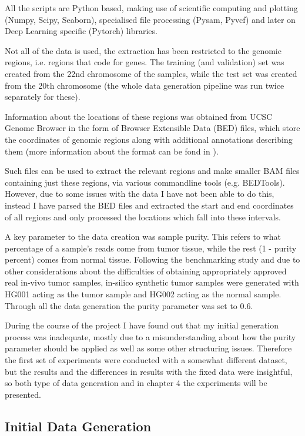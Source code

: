 \documentclass[bsc,frontabs,singlespacing,parskip,deptreport]{infthesis}
\begin{document}
All the scripts are Python based, making use of scientific computing and plotting (Numpy, Scipy, Seaborn), specialised file processing (Pysam, Pyvcf) and later on Deep Learning specific (Pytorch) libraries.

Not all of the data is used, the extraction has been restricted to the genomic regions, i.e. regions that code for genes. The training (and validation) set was created from the 22nd chromosome of the samples, while the test set was created from the 20th chromosome (the whole data generation pipeline was run twice separately for these).

Information about the locations of these regions was obtained from UCSC Genome Browser \cite{ucsc_genome} in the form of Browser Extensible Data (BED) files, which store the coordinates of genomic regions along with additional annotations describing them (more information about the format can be fond in \cite{ucsc_genome}).

Such files can be used to extract the relevant regions and make smaller BAM files containing just these regions, via various commandline tools (e.g. BEDTools). However, due to some issues with the data I have not been able to do this, instead I have parsed the BED files and extracted the start and end coordinates of all regions and only processed the locations which fall into these intervals.

A key parameter to the data creation was sample purity. This refers to what percentage of a sample's reads come from tumor tissue, while the rest (1 - purity percent) comes from normal tissue. Following the benchmarking study and due to other considerations about the difficulties of obtaining appropriately approved real in-vivo tumor samples, in-silico synthetic tumor samples were generated with HG001 acting as the tumor sample and HG002 acting as the normal sample. Through all the data generation the purity parameter was set to 0.6.

During the course of the project I have found out that my initial generation process was inadequate, mostly due to a misunderstanding about how the purity parameter should be applied as well as some other structuring issues. Therefore the first set of experiments were conducted with a somewhat different dataset, but the results and the differences in results with the fixed data were insightful, so both type of data generation and in chapter 4 the experiments will be presented.

\subsection{Initial Data Generation}
\end{document}
